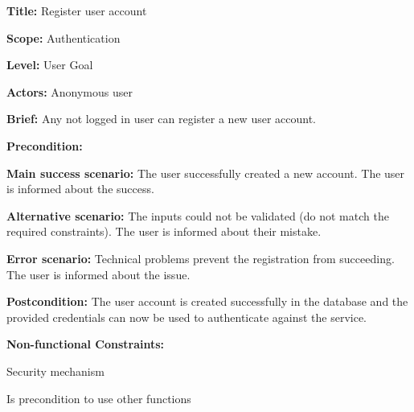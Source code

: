
\begin{DoxyItemize}
\item {\bfseries Title\+:} Register user account
\item {\bfseries Scope\+:} Authentication
\item {\bfseries Level\+:} User Goal
\item {\bfseries Actors\+:} Anonymous user
\item {\bfseries Brief\+:} Any not logged in user can register a new user account.
\end{DoxyItemize}


\begin{DoxyItemize}
\item {\bfseries Precondition\+:}
\item {\bfseries Main success scenario\+:} The user successfully created a new account. The user is informed about the success.
\item {\bfseries Alternative scenario\+:} The inputs could not be validated (do not match the required constraints). The user is informed about their mistake.
\item {\bfseries Error scenario\+:} Technical problems prevent the registration from succeeding. The user is informed about the issue.
\item {\bfseries Postcondition\+:} The user account is created successfully in the database and the provided credentials can now be used to authenticate against the service.
\item {\bfseries Non-\/functional Constraints\+:}
\begin{DoxyItemize}
\item Security mechanism
\item Is precondition to use other functions 
\end{DoxyItemize}
\end{DoxyItemize}